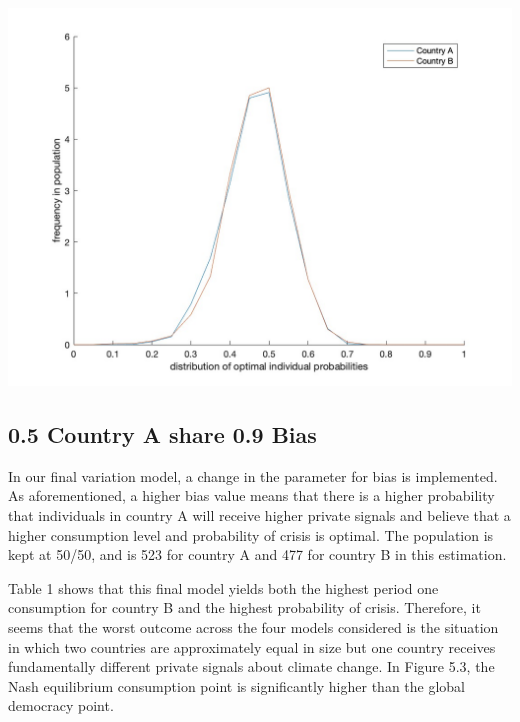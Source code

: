 \documentclass[11pt,preprint, authoryear]{elsarticle}
\let\origfigure\figure
\let\endorigfigure\endfigure
\renewenvironment{figure}[1][2] {
    \expandafter\origfigure\expandafter[H]
} {
    \endorigfigure
}
\numberwithin{equation}{section}
\numberwithin{figure}{section}
\numberwithin{table}{section}
\begin{document}
\begin{figure}[H]

{\centering \includegraphics[width=0.8\linewidth]{images/Fig4_0.5Size0Bias} 

}

\caption{50/50 country split model: Kernel density function of the distribution of the optimal probabilty of crisis and frequency thereof across individuals in country A and country B}\label{fig:unnamed-chunk-6}
\end{figure}

\hypertarget{country-a-share-0.9-bias}{%
\subsection*{0.5 Country A share 0.9
Bias}\label{country-a-share-0.9-bias}}

In our final variation model, a change in the parameter for bias is
implemented. As aforementioned, a higher bias value means that there is
a higher probability that individuals in country A will receive higher
private signals and believe that a higher consumption level and
probability of crisis is optimal. The population is kept at 50/50, and
is 523 for country A and 477 for country B in this estimation.

Table 1 shows that this final model yields both the highest period one
consumption for country B and the highest probability of crisis.
Therefore, it seems that the worst outcome across the four models
considered is the situation in which two countries are approximately
equal in size but one country receives fundamentally different private
signals about climate change. In Figure 5.3, the Nash equilibrium
consumption point is significantly higher than the global democracy
point.
\end{document}
